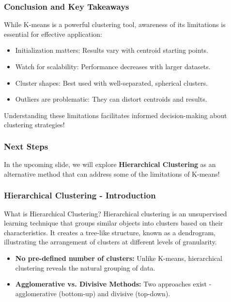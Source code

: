 \documentclass[aspectratio=169]{beamer}
\begin{document}
\begin{frame}[fragile]
    \frametitle{Conclusion and Key Takeaways}
    While K-means is a powerful clustering tool, awareness of its limitations is essential for effective application:
    \begin{itemize}
        \item Initialization matters: Results vary with centroid starting points.
        \item Watch for scalability: Performance decreases with larger datasets.
        \item Cluster shapes: Best used with well-separated, spherical clusters.
        \item Outliers are problematic: They can distort centroids and results.
    \end{itemize}
    Understanding these limitations facilitates informed decision-making about clustering strategies!
\end{frame}

\begin{frame}[fragile]
    \frametitle{Next Steps}
    In the upcoming slide, we will explore \textbf{Hierarchical Clustering} as an alternative method that can address some of the limitations of K-means!
\end{frame}

\begin{frame}[fragile]
    \frametitle{Hierarchical Clustering - Introduction}
    \begin{block}{What is Hierarchical Clustering?}
        Hierarchical clustering is an unsupervised learning technique that groups similar objects into clusters based on their characteristics.
        It creates a tree-like structure, known as a dendrogram, illustrating the arrangement of clusters at different levels of granularity.
    \end{block}
    
    \begin{itemize}
        \item \textbf{No pre-defined number of clusters:} Unlike K-means, hierarchical clustering reveals the natural grouping of data.
        \item \textbf{Agglomerative vs. Divisive Methods:} Two approaches exist - agglomerative (bottom-up) and divisive (top-down).
    \end{itemize}
\end{frame}
\end{document}
